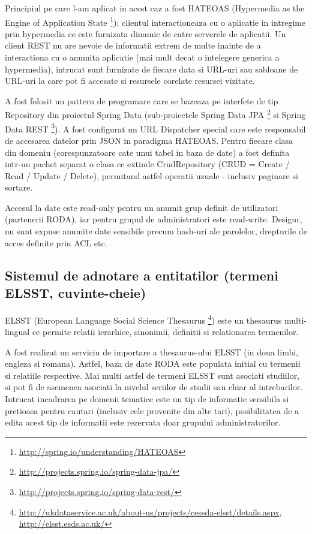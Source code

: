 \documentclass[a4paper, 10pt]{article}
\begin{document}
{Principiul pe care l-am aplicat in acest caz a fost HATEOAS (Hypermedia as the Engine of Application State   \footnote{\url{ http://spring.io/understanding/HATEOAS}});
clientul interactioneaza cu o aplicatie in intregime prin hypermedia ce este furnizata dinamic de catre serverele de aplicatii.
Un client REST nu are nevoie de informatii extrem de multe inainte de a interactiona cu o anumita aplicatie (mai mult decat o intelegere generica a hypermedia), 
intrucat sunt furnizate de fiecare data si URL-uri sau sabloane de URL-uri la care pot fi accesate si resursele corelate resursei vizitate.

A fost folosit un pattern de programare care se bazeaza pe interfete de tip Repository 
din proiectul Spring Data (sub-proiectele Spring Data JPA \footnote{\url{http://projects.spring.io/spring-data-jpa/}} si Spring Data REST \footnote{\url{http://projects.spring.io/spring-data-rest/}}). 
A fost configurat un URL Dispatcher special care este responsabil de accesarea datelor prin JSON in paradigma HATEOAS. 
Pentru fiecare clasa din domeniu (corespunzatoare cate unui tabel in baza de date) 
a fost definita intr-un pachet separat o clasa ce extinde CrudRepository (CRUD = Create / Read / Update / Delete), 
permitand astfel operatii uzuale - inclusiv paginare si sortare.

Accesul la date este read-only pentru un anumit grup definit de utilizatori (partenerii RODA), 
iar pentru grupul de administratori este read-write. 
Desigur, nu sunt expuse anumite date sensibile precum hash-uri ale parolelor, drepturile de acces definite prin ACL etc.

\subsection{Sistemul de adnotare a entitatilor (termeni ELSST, cuvinte-cheie)}

ELSST (European Language Social Science Thesaurus \footnote{\url{http://ukdataservice.ac.uk/about-us/projects/cessda-elsst/details.aspx}, \url{http://elsst.esds.ac.uk/}}) 
este un thesaurus multi-lingual ce permite relatii ierarhice, sinonimii, definitii si relationarea termenilor.

A fost realizat un serviciu de importare a thesaurus-ului ELSST (in doua limbi, engleza si romana). 
Astfel, baza de date RODA este populata initial cu termenii si relatiile respective.
Mai multi astfel de termeni ELSST sunt asociati studiilor, 
si pot fi de asemenea asociati la nivelul seriilor de studii sau chiar al intrebarilor.
Intrucat incadrarea pe domenii tematice este un tip de informatie sensibila si pretioasa pentru cautari 
(inclusiv cele provenite din alte tari),
posibilitatea de a edita acest tip de informatii este rezervata doar grupului administratorilor.

}
\end{document}

